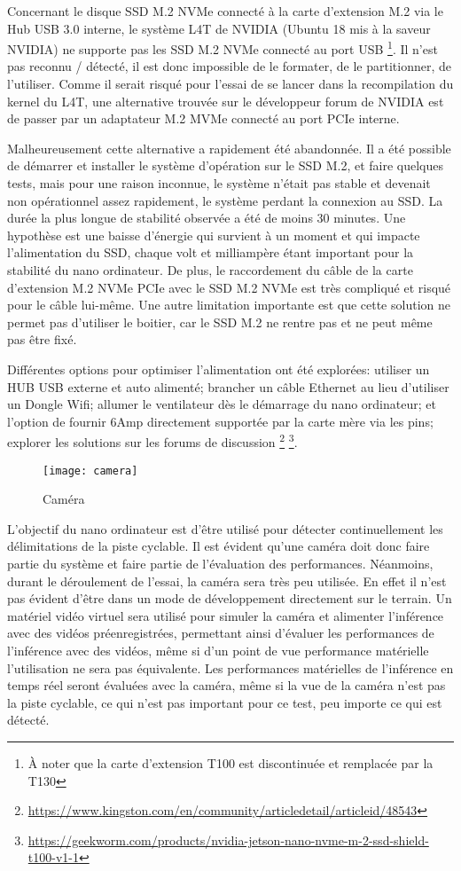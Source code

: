 \par Concernant le disque SSD M.2 NVMe connecté à la carte d'extension M.2 via le Hub USB 3.0 interne, le système L4T de NVIDIA (Ubuntu 18 mis à la saveur NVIDIA) ne supporte pas les SSD M.2 NVMe connecté au port USB \footnote{À noter que la carte d'extension T100 est discontinuée et remplacée par la T130}. Il n'est pas reconnu / détecté, il est donc impossible de le formater, de le partitionner, de l'utiliser. Comme il serait risqué pour l'essai de se lancer dans la recompilation du kernel du L4T, une alternative trouvée sur le développeur forum de NVIDIA est de passer par un adaptateur M.2 MVMe connecté au port PCIe interne.
\par Malheureusement cette alternative a rapidement été abandonnée. Il a été possible de démarrer et installer le système d'opération sur le SSD M.2, et faire quelques tests, mais pour une raison inconnue, le système n'était pas stable et devenait non opérationnel assez rapidement, le système perdant la connexion au SSD. La durée la plus longue de stabilité observée a été de moins 30 minutes. Une hypothèse est une baisse d'énergie qui survient à un moment et qui impacte l'alimentation du SSD, chaque volt et milliampère étant important pour la stabilité du nano ordinateur. De plus, le raccordement du câble de la carte d'extension M.2 NVMe PCIe avec le SSD M.2 NVMe est très compliqué et risqué pour le câble lui-même. Une autre limitation importante est que cette solution ne permet pas d'utiliser le boitier, car le SSD M.2 ne rentre pas et ne peut même pas être fixé. 
\par Différentes options pour optimiser l'alimentation ont été explorées: utiliser un HUB USB externe et auto alimenté; brancher un câble Ethernet au lieu d'utiliser un Dongle Wifi; allumer le ventilateur dès le démarrage du nano ordinateur; et l'option de fournir 6Amp directement supportée par la carte mère via les pins; explorer les solutions sur les forums de discussion \footnote{\url{https://www.kingston.com/en/community/articledetail/articleid/48543}} \footnote{\url{https://geekworm.com/products/nvidia-jetson-nano-nvme-m-2-ssd-shield-t100-v1-1}}.
\begin{figure}[H]
    \centering
    \texttt{[image: camera]}
    \caption{Caméra}
    \label{fig:camera}
\end{figure}
\par L'objectif du nano ordinateur est d'être utilisé pour détecter continuellement les délimitations de la piste cyclable. Il est évident qu'une caméra doit donc faire partie du système et faire partie de l'évaluation des performances. Néanmoins, durant le déroulement de l'essai, la caméra sera très peu utilisée. En effet il n'est pas évident d'être dans un mode de développement directement sur le terrain. Un matériel vidéo virtuel sera utilisé pour simuler la caméra et alimenter l'inférence avec des vidéos préenregistrées, permettant ainsi d'évaluer les performances de l'inférence avec des vidéos, même si d'un point de vue performance matérielle l'utilisation ne sera pas équivalente. Les performances matérielles de l'inférence en temps réel seront évaluées avec la caméra, même si la vue de la caméra n'est pas la piste cyclable, ce qui n'est pas important pour ce test, peu importe ce qui est détecté. 
